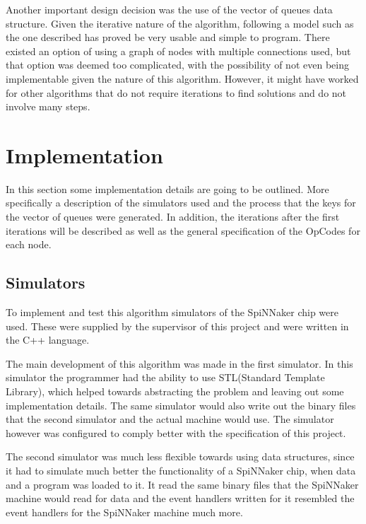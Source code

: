 \documentclass[12pt,a4paper]{article}
\begin{document}
Another important design decision was the use of the vector of queues data structure. Given the iterative nature of the algorithm, following a model such as the one described has proved be very usable and simple to program. There existed an option of using a graph of nodes with multiple connections used, but that option was deemed too complicated, with the possibility of not even being implementable given the nature of this algorithm. However, it might have worked for other algorithms that do not require iterations to find solutions and do not involve many steps.
\section{Implementation}
In this section some implementation details are going to be outlined. More specifically a description of the simulators used and the process that the keys for the vector of queues were generated. In addition, the iterations after the first iterations will be described as well as the general specification of the OpCodes for each node.
\subsection{Simulators}
To implement and test this algorithm simulators of the SpiNNaker chip were used. These were supplied by the supervisor of this project and were written in the C++ language. 

The main development of this algorithm was made in the first simulator. In this simulator the programmer had the ability to use STL(Standard Template Library), which helped towards abstracting the problem and leaving out some implementation details. The same simulator would also write out the binary files that the second simulator and the actual machine would use. The simulator however was configured to comply better with the specification of this project.

The second simulator was much less flexible towards using data structures, since it had to simulate much better the functionality of a SpiNNaker chip, when data and a program was loaded to it. It read the same binary files that the SpiNNaker machine would read for data and the event handlers written for it resembled the event handlers for the SpiNNaker machine much more.
\end{document}
